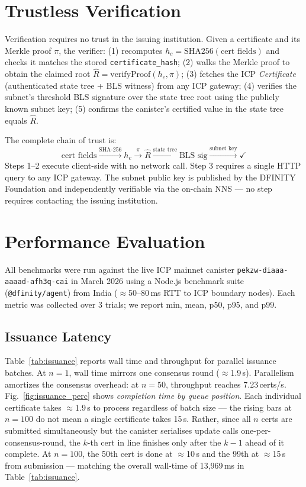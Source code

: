 \documentclass[conference]{IEEEtran}
\begin{document}
\section{Trustless Verification}
\label{sec:trustless}

Verification requires no trust in the issuing institution. Given a certificate and its Merkle proof $\pi$, the verifier: (1) recomputes $h_c = \mathrm{SHA256}(\text{cert fields})$ and checks it matches the stored \texttt{certificate\_hash}; (2) walks the Merkle proof to obtain the claimed root $\hat{R} = \mathrm{verifyProof}(h_c, \pi)$; (3) fetches the ICP \textit{Certificate} (authenticated state tree + BLS witness) from any ICP gateway; (4) verifies the subnet's threshold BLS signature over the state tree root using the publicly known subnet key; (5) confirms the canister's certified value in the state tree equals $\hat{R}$.

The complete chain of trust is:
\begin{equation}
  \text{cert fields} \xrightarrow{\text{SHA-256}} h_c \xrightarrow{\;\pi\;} \hat{R} \xrightarrow{\text{state tree}} \text{BLS sig} \xrightarrow{\text{subnet key}} \checkmark
\end{equation}
Steps 1--2 execute client-side with no network call. Step 3 requires a single HTTP query to any ICP gateway. The subnet public key is published by the DFINITY Foundation and independently verifiable via the on-chain NNS — no step requires contacting the issuing institution.

\section{Performance Evaluation}
\label{sec:eval}

All benchmarks were run against the live ICP mainnet canister \texttt{pekzw-diaaa-aaaad-afh3q-cai} in March 2026 using a Node.js benchmark suite (\texttt{@dfinity/agent}) from India ($\approx$50--80\,ms RTT to ICP boundary nodes). Each metric was collected over 3 trials; we report min, mean, p50, p95, and p99.

\subsection{Issuance Latency}
Table~\ref{tab:issuance} reports wall time and throughput for parallel issuance batches. At $n{=}1$, wall time mirrors one consensus round ($\approx$1.9\,s). Parallelism amortizes the consensus overhead: at $n{=}50$, throughput reaches 7.23\,certs/s. Fig.~\ref{fig:issuance_perc} shows \textit{completion time by queue position}. Each individual certificate takes $\approx$1.9\,s to process regardless of batch size — the rising bars at $n{=}100$ do not mean a single certificate takes 15\,s. Rather, since all $n$ certs are submitted simultaneously but the canister serialises update calls one-per-consensus-round, the $k$-th cert in line finishes only after the $k{-}1$ ahead of it complete. At $n{=}100$, the 50th cert is done at $\approx$10\,s and the 99th at $\approx$15\,s from submission — matching the overall wall-time of 13{,}969\,ms in Table~\ref{tab:issuance}.
\end{document}
